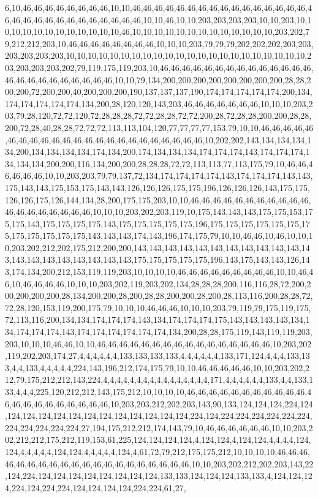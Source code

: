6,10,46,46,46,46,46,46,46,46,10,10,46,46,46,46,46,46,46,46,46,46,46,46,46,46,46,46,46,46,46,46,46,46,46,46,46,46,46,46,46,10,10,46,10,10,203,203,203,203,10,10,203,10,10,10,10,10,10,10,10,10,10,10,10,46,10,10,10,10,10,10,10,10,10,10,10,10,10,203,202,79,212,212,203,10,46,46,46,46,46,46,46,46,10,10,10,203,79,79,79,202,202,202,203,203,203,203,203,203,10,10,10,10,10,10,10,10,10,10,10,10,10,10,10,10,10,10,10,10,10,10,203,203,203,203,202,79,119,175,119,203,10,46,46,46,46,46,46,46,46,46,46,46,46,46,46,46,46,46,46,46,46,46,46,46,46,10,10,79,134,200,200,200,200,200,200,200,200,28,28,200,200,72,200,200,40,200,200,200,190,137,137,137,190,174,174,174,174,174,200,134,174,174,174,174,174,134,200,28,120,120,143,203,46,46,46,46,46,46,46,10,10,10,203,203,79,28,120,72,72,120,72,28,28,28,72,72,28,28,72,72,200,28,72,28,28,200,200,28,28,200,72,28,40,28,28,72,72,72,113,113,104,120,77,77,77,77,153,79,10,10,46,46,46,46,46,46,46,46,46,46,46,46,46,46,46,46,46,46,46,46,46,46,46,10,202,202,143,134,134,134,134,200,134,134,134,134,174,134,200,174,134,134,134,174,174,174,143,174,174,174,134,134,134,200,200,116,134,200,200,28,28,28,72,72,113,113,77,113,175,79,10,46,46,46,46,46,46,10,10,203,203,79,79,137,72,134,174,174,174,174,143,174,174,174,143,143,175,143,143,175,153,175,143,143,126,126,126,175,175,196,126,126,126,143,175,175,126,126,175,126,144,134,28,200,175,175,203,10,10,46,46,46,46,46,46,46,46,46,46,46,46,46,46,46,46,46,46,46,10,10,10,203,202,203,119,10,175,143,143,143,175,175,153,175,175,143,175,175,175,175,143,175,175,175,175,175,196,175,175,175,175,175,175,175,175,175,175,175,175,143,143,143,174,143,196,174,175,79,10,10,46,46,10,46,10,10,10,203,202,212,202,175,212,200,200,143,143,143,143,143,143,143,143,143,143,143,143,143,143,143,143,143,143,143,143,175,175,175,175,175,196,143,175,143,143,126,143,174,134,200,212,153,119,119,203,10,10,10,10,46,46,46,46,46,46,46,46,46,10,10,46,46,10,46,46,46,46,10,10,10,203,202,119,203,202,134,28,28,28,200,116,116,28,72,200,200,200,200,200,28,134,200,200,28,200,28,28,200,200,28,200,28,113,116,200,28,28,72,72,28,120,153,119,200,175,79,10,10,10,46,46,46,10,10,10,203,79,119,79,175,119,175,72,113,116,200,134,134,174,174,174,143,134,174,174,174,175,143,143,143,143,134,134,174,174,174,143,174,174,174,174,174,174,134,200,28,28,175,119,143,119,119,203,203,10,10,10,46,46,10,10,46,46,46,46,46,46,46,46,46,46,46,46,46,46,46,46,10,203,202,119,202,203,174,27,4,4,4,4,4,4,133,133,133,133,4,4,4,4,4,4,133,171,124,4,4,4,133,133,4,4,133,4,4,4,4,4,224,143,196,212,174,175,79,10,10,46,46,46,46,46,10,10,203,202,212,79,175,212,212,143,224,4,4,4,4,4,4,4,4,4,4,4,4,4,4,4,4,171,4,4,4,4,4,4,133,4,4,133,133,4,4,4,225,120,212,212,143,175,212,10,10,10,10,46,46,46,46,46,46,46,46,46,46,46,46,46,46,46,46,46,46,46,46,46,10,203,203,212,202,203,143,90,133,124,124,124,224,124,124,124,124,124,124,124,124,124,124,124,124,124,224,124,224,224,224,224,224,224,224,224,224,224,224,27,194,175,212,212,174,143,79,10,46,46,46,46,46,46,10,10,203,202,212,212,175,212,119,153,61,225,124,124,124,124,4,124,124,4,124,124,4,4,4,4,124,124,4,4,4,4,4,124,124,4,4,4,4,4,124,4,61,72,79,212,175,175,212,10,10,10,10,46,46,46,46,46,46,46,46,46,46,46,46,46,46,46,46,46,46,46,46,10,10,203,202,212,202,203,143,22,124,224,124,124,124,124,124,124,124,124,133,133,124,124,124,133,133,4,124,124,124,224,124,224,224,124,124,124,124,224,224,61,27,